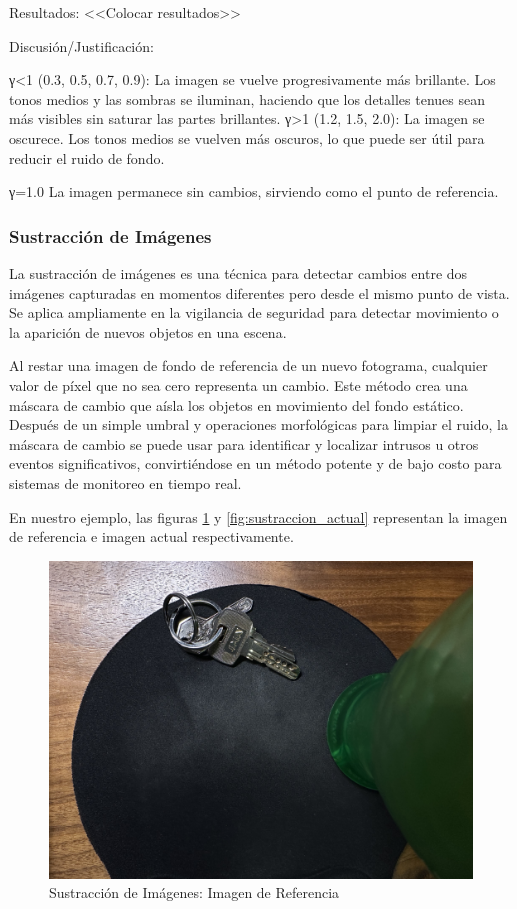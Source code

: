 \documentclass[12pt,letterpaper]{article}
\begin{document}
Resultados:
<<Colocar resultados>>


Discusión/Justificación:

γ<1
(0.3, 0.5, 0.7, 0.9): La imagen se vuelve progresivamente más brillante. Los tonos medios y las sombras se iluminan, haciendo que los detalles tenues sean más visibles sin saturar las partes brillantes.
γ>1
(1.2, 1.5, 2.0): La imagen se oscurece. Los tonos medios se vuelven más oscuros, lo que puede ser útil para reducir el ruido de fondo.

γ=1.0
La imagen permanece sin cambios, sirviendo como el punto de referencia.


\subsubsection{Sustracción de Imágenes}

La sustracción de imágenes es una técnica para detectar cambios entre dos imágenes capturadas en momentos diferentes pero desde el mismo punto de vista. Se aplica ampliamente en la vigilancia de seguridad para detectar movimiento o la aparición de nuevos objetos en una escena.

Al restar una imagen de fondo de referencia de un nuevo fotograma, cualquier valor de píxel que no sea cero representa un cambio. Este método crea una máscara  de cambio que aísla los objetos en movimiento del fondo estático. Después de un simple umbral y operaciones morfológicas para limpiar el ruido, la máscara de cambio se puede usar para identificar y localizar intrusos u otros eventos significativos, convirtiéndose en un método potente y de bajo costo para sistemas de monitoreo en tiempo real.

En nuestro ejemplo, las figuras \ref{fig:sustraccion_referencia} y \ref{fig:sustraccion_actual} representan la imagen de referencia e imagen actual respectivamente.

\begin{figure}[H]
  \centering
  \includegraphics[width=0.5\linewidth]{../data/data-substraction-sample/img-1.jpg}
  \caption{Sustracción de Imágenes: Imagen de Referencia}
  \label{fig:sustraccion_referencia}
\end{figure}
\end{document}
